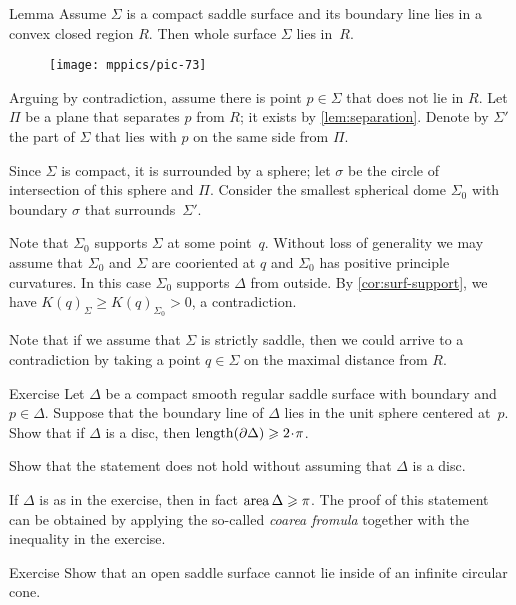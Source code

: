 \begin{thm}{Lemma}\label{lem:convex-saddle}
Assume $\Sigma$ is a compact saddle surface and its boundary line lies in a convex closed region $R$.
Then whole surface $\Sigma$ lies in~$R$.
\end{thm}

\begin{wrapfigure}{O}{50 mm}
\vskip-0mm
\centering
\texttt{[image: mppics/pic-73]}
\vskip0mm
\end{wrapfigure}

Arguing by contradiction,
assume there is point $p\in \Sigma$ that does not lie in $R$.
Let $\Pi$ be a plane that separates $p$ from $R$; it exists by \ref{lem:separation}.
Denote by $\Sigma'$ the part of $\Sigma$ that lies with $p$ on the same side from $\Pi$.

Since $\Sigma$ is compact, it is surrounded by a sphere;
let $\sigma$ be the circle of intersection of this sphere and $\Pi$.
Consider the smallest spherical dome $\Sigma_0$ with boundary $\sigma$ that surrounds~$\Sigma'$.

Note that $\Sigma_0$ supports $\Sigma$ at some point~$q$.
Without loss of generality we may assume that $\Sigma_0$ and $\Sigma$ are cooriented at $q$ and $\Sigma_0$ has positive principle curvatures.
In this case $\Sigma_0$ supports $\Delta$ from outside.
By \ref{cor:surf-support}, we have $K(q)_\Sigma\ge K(q)_{\Sigma_0}>0$, a contradiction.
\qeds

Note that if we assume that $\Sigma$ is strictly saddle, then we could arrive to a contradiction by taking a point $q\in \Sigma$ on the maximal distance from $R$.

\begin{thm}{Exercise}\label{ex:length-of-bry}
Let $\Delta$ be a compact smooth regular saddle surface with boundary and $p\in \Delta$.
Suppose that the boundary line of $\Delta$ lies in the unit sphere centered at~$p$.
Show that if $\Delta$ is a disc, then $\length (\partial \Delta)\ge 2\cdot\pi$.

Show that the statement does not hold without assuming that $\Delta$ is a disc.
\end{thm}

If $\Delta$ is as in the exercise, then in fact $\mathop{\rm area}\nolimits \Delta\geqslant \pi$.
The proof of this statement can be obtained by applying the so-called \emph{coarea fromula} together with the inequality in the exercise. 

\begin{thm}{Exercise}\label{ex:circular-cone-saddle}
Show that an open saddle surface
cannot lie inside of an infinite circular cone. 
\end{thm}

